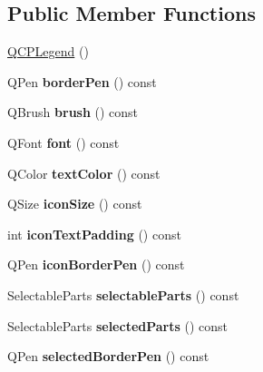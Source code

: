 \subsection*{Public Member Functions}
\begin{DoxyCompactItemize}
\item 
\hyperlink{class_q_c_p_legend_a0001a456989bd07ea378883651fabd72}{Q\+C\+P\+Legend} ()
\item 
\hypertarget{class_q_c_p_legend_a844b709a5632313416655f931c8e5631}{}\label{class_q_c_p_legend_a844b709a5632313416655f931c8e5631} 
Q\+Pen {\bfseries border\+Pen} () const
\item 
\hypertarget{class_q_c_p_legend_aaddafd5cbe9175512311350bb3b563e6}{}\label{class_q_c_p_legend_aaddafd5cbe9175512311350bb3b563e6} 
Q\+Brush {\bfseries brush} () const
\item 
\hypertarget{class_q_c_p_legend_ae240104de3c3a4cfc0834dbaffa07ac9}{}\label{class_q_c_p_legend_ae240104de3c3a4cfc0834dbaffa07ac9} 
Q\+Font {\bfseries font} () const
\item 
\hypertarget{class_q_c_p_legend_aa96d8f1a183ec2be8c0461c0abebd6db}{}\label{class_q_c_p_legend_aa96d8f1a183ec2be8c0461c0abebd6db} 
Q\+Color {\bfseries text\+Color} () const
\item 
\hypertarget{class_q_c_p_legend_ae4f17a186558c82d2ba269f6e7164dda}{}\label{class_q_c_p_legend_ae4f17a186558c82d2ba269f6e7164dda} 
Q\+Size {\bfseries icon\+Size} () const
\item 
\hypertarget{class_q_c_p_legend_a19668bb7f8fafe20d367cebf96269eaf}{}\label{class_q_c_p_legend_a19668bb7f8fafe20d367cebf96269eaf} 
int {\bfseries icon\+Text\+Padding} () const
\item 
\hypertarget{class_q_c_p_legend_a5b91d2ea68a4dd20238f660b80cd9945}{}\label{class_q_c_p_legend_a5b91d2ea68a4dd20238f660b80cd9945} 
Q\+Pen {\bfseries icon\+Border\+Pen} () const
\item 
\hypertarget{class_q_c_p_legend_ad091ff5e11edbe0adecba81c35522ac7}{}\label{class_q_c_p_legend_ad091ff5e11edbe0adecba81c35522ac7} 
Selectable\+Parts {\bfseries selectable\+Parts} () const
\item 
\hypertarget{class_q_c_p_legend_a3efbf879f6936ec337690985e567dc6f}{}\label{class_q_c_p_legend_a3efbf879f6936ec337690985e567dc6f} 
Selectable\+Parts {\bfseries selected\+Parts} () const
\item 
\hypertarget{class_q_c_p_legend_add8204bf083c82cc5def29093501a017}{}\label{class_q_c_p_legend_add8204bf083c82cc5def29093501a017} 
Q\+Pen {\bfseries selected\+Border\+Pen} () const

\end{DoxyCompactItemize}
